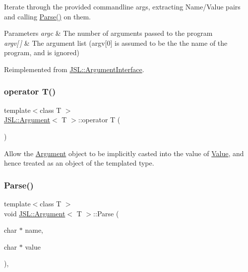 Iterate through the provided commandline args, extracting Name/\+Value pairs and calling \hyperlink{classJSL_1_1Argument_a8984e7ce23155259d90a3e98170f36e0}{Parse()} on them. 


\begin{DoxyParams}{Parameters}
{\em argc} & The number of arguments passed to the program \\
\hline
{\em argv\mbox{[}$\,$\mbox{]}} & The argument list (argv\mbox{[}0\mbox{]} is assumed to be the the name of the program, and is ignored) \\
\hline
\end{DoxyParams}


Reimplemented from \hyperlink{classJSL_1_1ArgumentInterface_a256b5bd88b5f6638353f108c48f3ee65}{J\+S\+L\+::\+Argument\+Interface}.

\mbox{\label{classJSL_1_1Argument_a965bc0dfdce6e03380605af313f8c880}} 
\subsubsection{\texorpdfstring{operator T()}{operator T()}}
{\footnotesize\ttfamily template$<$class T $>$ \\
\hyperlink{classJSL_1_1Argument}{J\+S\+L\+::\+Argument}$<$ T $>$\+::operator T (\begin{DoxyParamCaption}{ }\end{DoxyParamCaption})\hspace{0.3cm}{\ttfamily [inline]}}



Allow the \hyperlink{classJSL_1_1Argument}{Argument} object to be implicitly casted into the value of \hyperlink{classJSL_1_1Argument_a83ada5bfa412192f76dd4290f679defd}{Value}, and hence treated as an object of the templated type. 

\mbox{\label{classJSL_1_1Argument_a8984e7ce23155259d90a3e98170f36e0}} 
\subsubsection{\texorpdfstring{Parse()}{Parse()}}
{\footnotesize\ttfamily template$<$class T $>$ \\
void \hyperlink{classJSL_1_1Argument}{J\+S\+L\+::\+Argument}$<$ T $>$\+::Parse (\begin{DoxyParamCaption}\item[{char $\ast$}]{name,  }\item[{char $\ast$}]{value }\end{DoxyParamCaption})\hspace{0.3cm}{\ttfamily [inline]}, {\ttfamily [virtual]}}



